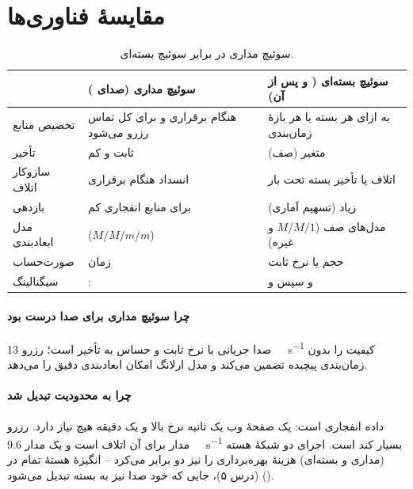\documentclass[11pt,a4paper]{article}
\begin{document}
\section{مقایسهٔ فناوری‌ها}
\begin{table}[htbp]
\centering\small
\caption{سوئیچ مداری در برابر سوئیچ بسته‌ای.}\label{tab:csps}
\begin{tabularx}{\linewidth}{@{}l Y Y@{}}
\toprule
{} & سوئیچ مداری (صدای ) & سوئیچ بسته‌ای ( و پس از آن) \\
\midrule
تخصیص منابع & هنگام برقراری و برای کل تماس رزرو می‌شود & به ازای هر بسته یا هر بازهٔ زمان‌بندی \\
تأخیر       & ثابت و کم                                  & متغیر (صف) \\
سازوکار اتلاف & انسداد هنگام برقراری                     & اتلاف یا تأخیر بسته تحت بار \\
بازدهی      & برای منابع انفجاری کم                       & زیاد (تسهیم آماری) \\
مدل ابعادبندی &  ($M/M/m/m$)                & مدل‌های صف ($M/M/1$ و غیره) \\
صورت‌حساب   & زمان                                       & حجم یا نرخ ثابت \\
سیگنالینگ   & :                 &  و سپس  و  \\
\bottomrule
\end{tabularx}
\end{table}

\paragraph{چرا سوئیچ مداری برای صدا درست بود} صدا جریانی با نرخ ثابت و حساس به تأخیر است؛ رزرو
\qty{13}{\kilo\bit\per\second} کیفیت را بدون زمان‌بندی پیچیده تضمین می‌کند و مدل ارلانگ امکان
ابعادبندی دقیق را می‌دهد. \paragraph{چرا به محدودیت تبدیل شد} داده انفجاری است: یک صفحهٔ وب
یک ثانیه نرخ بالا و یک دقیقه هیچ نیاز دارد. رزرو مدار برای آن اتلاف است و یک مدار
\qty{9.6}{\kilo\bit\per\second} بسیار کند است. اجرای دو شبکهٔ هسته (مداری و بسته‌ای) هزینهٔ
بهره‌برداری را نیز دو برابر می‌کرد -- انگیزهٔ هستهٔ تمام‌ در  (درس ۵)، جایی که
خود صدا نیز به بسته تبدیل می‌شود ().
\end{document}
